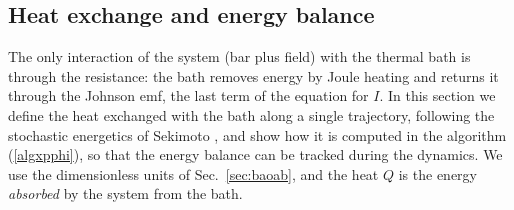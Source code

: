 \documentclass[11pt]{article}
\begin{document}
\subsection{Heat exchange and energy balance}\label{sec:heat}
The only interaction of the system (bar plus field) with the thermal bath is through the resistance: the bath removes energy by Joule heating and returns it through the Johnson emf, the last term of the equation for $I$. In this section we define the heat exchanged with the bath along a single trajectory, following the stochastic energetics of Sekimoto \cite{sekimoto}, and show how it is computed in the algorithm (\ref{algxpphi}), so that the energy balance can be tracked during the dynamics. We use the dimensionless units of Sec.~\ref{sec:baoab}, and the heat $Q$ is the energy {\it absorbed} by the system from the bath.
\end{document}
